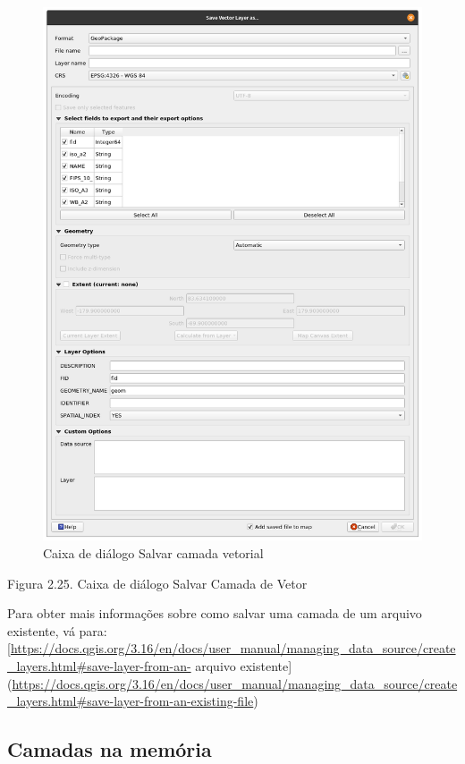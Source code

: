 \documentclass[
  portuguese,
]{krantz}
\begin{document}
\begin{figure}
\centering
\includegraphics{media/modulo2/save-vector.png}
\caption{Caixa de diálogo Salvar camada vetorial}
\end{figure}

Figura 2.25. Caixa de diálogo Salvar Camada de Vetor

Para obter mais informações sobre como salvar uma camada de um arquivo existente, vá para: {[}\url{https://docs.qgis.org/3.16/en/docs/user_manual/managing_data_source/create_layers.html\#save-layer-from-an-} arquivo existente{]} (\url{https://docs.qgis.org/3.16/en/docs/user_manual/managing_data_source/create_layers.html\#save-layer-from-an-existing-file})

\hypertarget{camadas-na-memuxf3ria}{%
\subsection{\texorpdfstring{\textbf{Camadas na memória}}{Camadas na memória}}\label{camadas-na-memuxf3ria}}
\end{document}
